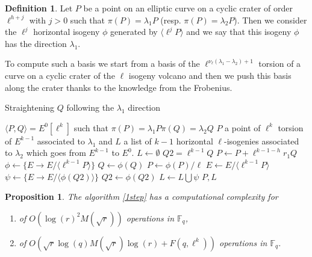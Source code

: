 \documentclass{article}
\theoremstyle{plain}
\newtheorem{prop}[thm]{Proposition}
\theoremstyle{definition}
\newtheorem{defi}[thm]{Definition}
\theoremstyle{remark}
\begin{document}
\begin{defi}
Let $P$ be a point on an elliptic curve on a cyclic crater of order $\ell^{h+j}$ with $j>0$ such that $\pi(P)=\lambda_1P$ (resp. $\pi(P)=\lambda_2P$). Then we consider the $\ell^j$ horizontal isogeny $\phi$ generated by $\langle \ell^{j}P \rangle$ and we say that this isogeny $\phi$ has the direction $\lambda_1$.
\end{defi}

To compute such a basis we start from a basis of the $\ell^{\nu_{\ell}(\lambda_1-\lambda_2)+1}$ torsion of a curve on a cyclic crater of the $\ell$ isogeny volcano and then we push this basis along the crater thanks to the knowledge from the Frobenius.

\begin{algorithm}
\caption{\label{1step}Straightening $Q$ following the $\lambda_1$ direction}
\begin{algorithmic}[5]
\REQUIRE $\langle P,Q \rangle = E^0[\ell^k]$ such that $\pi(P)=\lambda_1P \pi(Q)=\lambda_2Q$
\ENSURE $P$ a point of $\ell^k$ torsion of $E^{k-1}$ associated to $\lambda_1$ and $L$ a list of $k-1$ horizontal $\ell$-isogenies associated to $\lambda_2$ which goes from $E^{k-1}$ to $E^0$.
\STATE $L \gets \emptyset$
\STATE $Q2= \ell^{k-1}Q$
\STATE $P \gets P+\ell^{k-1-h}r_1Q$
\ENDIF
\STATE $\phi \leftarrow \{ E \rightarrow E/ \langle \ell^{k-1}P \rangle \}$
\STATE $Q \leftarrow \phi(Q)$
\STATE $P \leftarrow \phi(P)/ \ell$
\STATE $E \leftarrow E/ \langle \ell^{k-1}P \rangle$
\STATE $\psi \leftarrow \{ E \rightarrow E/ \langle \phi(Q2) \rangle \}$
\STATE $Q2 \gets \phi(Q2)$
\STATE $L \gets L \bigcup \psi$
\ENDFOR
\RETURN $P,L$
\end{algorithmic}
\end{algorithm}

\begin{prop}
The algorithm \ref{1step} has a computational complexity for
\begin{enumerate}
\item[$\ell =2$]
 of $O(\log(r)^2M(\sqrt{r}))$ operations in $\mathbb{F}_q$,
 \item[$\ell \neq 2$] of $O(\sqrt{r}\log(q)M(\sqrt{r})\log(r)+F(q,\ell^k))$ operations in $\mathbb{F}_q$.
 
\end{enumerate}
\end{prop}
\end{document}
